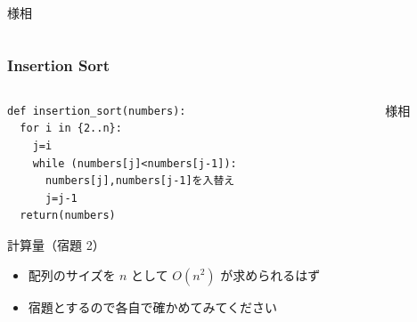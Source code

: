 \begin{frame}
\begin{columns}[t,onlytextwidth]
\begin{column}{0.55\linewidth}{様相}
\begin{center}
      \end{center}
    \end{column}
  \end{columns}
\end{frame}
\begin{frame}
\frametitle{Insertion Sort}
  \begin{columns}[t,onlytextwidth]
    \begin{column}{0.5\linewidth}
      \begin{lstlisting}[caption={擬似コード},label=insertion_sort]
def insertion_sort(numbers):
  for i in {2..n}:
    j=i
    while (numbers[j]<numbers[j-1]):
      numbers[j],numbers[j-1]を入替え
      j=j-1
  return(numbers)
      \end{lstlisting}
      \begin{itembox}[l]{計算量（宿題 2）}
        \begin{itemize}
\tiny
\item 配列のサイズを $n$ として \(O(n^2)\) が求められるはず
\item 宿題とするので各自で確かめてみてください
        \end{itemize}
      \end{itembox}
    \end{column}
    \begin{column}{0.55\linewidth}{様相}
      \begin{center}

\end{center}
\end{column}
\end{columns}
\end{frame}
